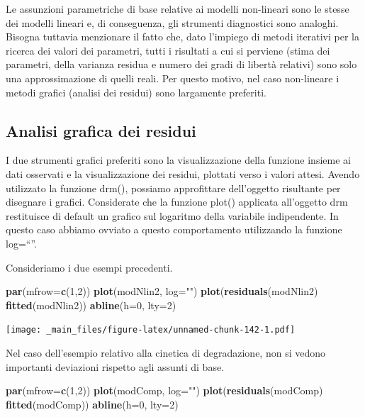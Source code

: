 \documentclass[a4paper,12pt,oneside]{book}
\newenvironment{Shaded}{\begin{snugshade}}{\end{snugshade}}
\newcommand{\KeywordTok}[1]{\textcolor[rgb]{0.13,0.29,0.53}{\textbf{#1}}}
\newcommand{\DataTypeTok}[1]{\textcolor[rgb]{0.13,0.29,0.53}{#1}}
\newcommand{\DecValTok}[1]{\textcolor[rgb]{0.00,0.00,0.81}{#1}}
\newcommand{\StringTok}[1]{\textcolor[rgb]{0.31,0.60,0.02}{#1}}
\newcommand{\OperatorTok}[1]{\textcolor[rgb]{0.81,0.36,0.00}{\textbf{#1}}}
\newcommand{\NormalTok}[1]{#1}
\theoremstyle{definition}
\theoremstyle{definition}
\theoremstyle{definition}
\theoremstyle{remark}
\begin{document}
Le assunzioni parametriche di base relative ai modelli non-lineari sono
le stesse dei modelli lineari e, di conseguenza, gli strumenti
diagnostici sono analoghi. Bisogna tuttavia menzionare il fatto che,
dato l'impiego di metodi iterativi per la ricerca dei valori dei
parametri, tutti i risultati a cui si perviene (stima dei parametri,
della varianza residua e numero dei gradi di libertà relativi) sono solo
una approssimazione di quelli reali. Per questo motivo, nel caso
non-lineare i metodi grafici (analisi dei residui) sono largamente
preferiti.

\subsection{Analisi grafica dei
residui}\label{analisi-grafica-dei-residui-1}

I due strumenti grafici preferiti sono la visualizzazione della funzione
insieme ai dati osservati e la visualizzazione dei residui, plottati
verso i valori attesi. Avendo utilizzato la funzione drm(), possiamo
approfittare dell'oggetto risultante per disegnare i grafici.
Considerate che la funzione plot() applicata all'oggetto drm restituisce
di default un grafico sul logaritmo della variabile indipendente. In
questo caso abbiamo ovviato a questo comportamento utilizzando la
funzione log=``''.

Consideriamo i due esempi precedenti.

\begin{Shaded}
\begin{Highlighting}[]
\KeywordTok{par}\NormalTok{(}\DataTypeTok{mfrow=}\KeywordTok{c}\NormalTok{(}\DecValTok{1}\NormalTok{,}\DecValTok{2}\NormalTok{))}
\KeywordTok{plot}\NormalTok{(modNlin2, }\DataTypeTok{log=}\StringTok{""}\NormalTok{)}
\KeywordTok{plot}\NormalTok{(}\KeywordTok{residuals}\NormalTok{(modNlin2) }\OperatorTok{~}\StringTok{ }\KeywordTok{fitted}\NormalTok{(modNlin2))}
\KeywordTok{abline}\NormalTok{(}\DataTypeTok{h=}\DecValTok{0}\NormalTok{, }\DataTypeTok{lty=}\DecValTok{2}\NormalTok{)}
\end{Highlighting}
\end{Shaded}

\texttt{[image: \_main\_files/figure-latex/unnamed-chunk-142-1.pdf]}

Nel caso dell'esempio relativo alla cinetica di degradazione, non si
vedono importanti deviazioni rispetto agli assunti di base.

\begin{Shaded}
\begin{Highlighting}[]
\KeywordTok{par}\NormalTok{(}\DataTypeTok{mfrow=}\KeywordTok{c}\NormalTok{(}\DecValTok{1}\NormalTok{,}\DecValTok{2}\NormalTok{))}
\KeywordTok{plot}\NormalTok{(modComp, }\DataTypeTok{log=}\StringTok{""}\NormalTok{)}
\KeywordTok{plot}\NormalTok{(}\KeywordTok{residuals}\NormalTok{(modComp) }\OperatorTok{~}\StringTok{ }\KeywordTok{fitted}\NormalTok{(modComp))}
\KeywordTok{abline}\NormalTok{(}\DataTypeTok{h=}\DecValTok{0}\NormalTok{, }\DataTypeTok{lty=}\DecValTok{2}\NormalTok{)}
\end{Highlighting}
\end{Shaded}
\end{document}

